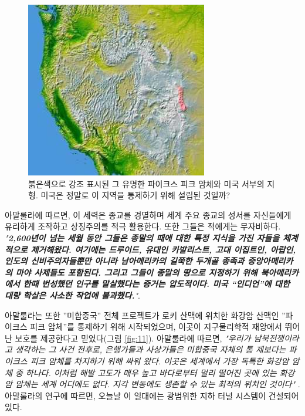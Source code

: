 \documentclass[10pt,twocolumn,letterpaper]{article}
\begin{document}
\begin{figure}[t]
\begin{center}
   \includegraphics[width=1\linewidth]{pike.jpg}
\end{center}
   \caption{붉은색으로 강조 표시된 그 유명한 파이크스 피크 암체와 미국 서부의 지형\cite{36}. 미국은 정말로 이 지역을 통제하기 위해 설립된 것일까?}
\label{fig:11}
\label{fig:onecol}
\end{figure}

아말룰라에 따르면, 이 세력은 종교를 경멸하며 세계 주요 종교의 성서를 자신들에게 유리하게 조작하고 상징주의를 적극 활용한다. 또한 그들은 적에게는 무자비하다. \textit{"\textbf{2,600년이 넘는 세월 동안 그들은 종말의 때에 대한 특정 지식을 가진 자들을 체계적으로 제거해왔다. 여기에는 드루이드, 유대인 카발리스트, 고대 이집트인, 아랍인, 인도의 신비주의자들뿐만 아니라 남아메리카의 길쭉한 두개골 종족과 중앙아메리카의 마야 사제들도 포함된다. 그리고 그들이 종말의 땅으로 지정하기 위해 북아메리카에서 한때 번성했던 인구를 말살했다는 증거는 압도적이다. 미국 “인디언”에 대한 대량 학살은 사소한 작업에 불과했다.}"}\cite{33,34}.

아말룰라는 또한 ”미합중국” 전체 프로젝트가 로키 산맥에 위치한 화강암 산맥인 ”파이크스 피크 암체”를 통제하기 위해 시작되었으며, 이곳이 지구물리학적 재앙에서 뛰어난 보호를 제공한다고 믿었다(그림 \ref{fig:11}). 아말룰라에 따르면, \textit{"우리가 남북전쟁이라고 생각하는 그 사건 전후로, 은행가들과 사상가들은 미합중국 자체의 통 제보다는 파이크스 피크 암체를 차지하기 위해 싸워 왔다. 이곳은 세계에서 가장 독특한 화강암 암체 중 하나다. 이처럼 해발 고도가 매우 높고 바다로부터 멀리 떨어진 곳에 있는 화강암 암체는 세계 어디에도 없다. 지각 변동에도 생존할 수 있는 최적의 위치인 것이다"} \cite{33,34}. 아말룰라의 연구에 따르면, 오늘날 이 일대에는 광범위한 지하 터널 시스템이 건설되어 있다\cite{36}.
\end{document}
